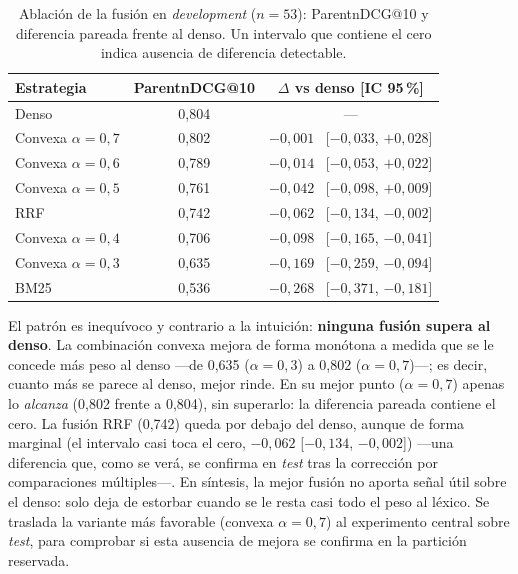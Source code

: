 \begin{table}[htbp]
    \centering
    \small
    \renewcommand{\arraystretch}{1.2}
    \caption{Ablación de la fusión en \emph{development} ($n=53$): ParentnDCG@10 y diferencia pareada frente al denso. Un intervalo que contiene el cero indica ausencia de diferencia detectable.}
    \label{tab:ablacion-fusion}
    \begin{tabular}{|l|c|c|}
        \hline
        \textbf{Estrategia} & \textbf{ParentnDCG@10} & \textbf{$\Delta$ vs denso [IC 95\,\%]} \\
        \hline
        Denso                 & 0,804 & --- \\
        Convexa $\alpha{=}0{,}7$ & 0,802 & $-0{,}001$ \ [$-0{,}033$, $+0{,}028$] \\
        Convexa $\alpha{=}0{,}6$ & 0,789 & $-0{,}014$ \ [$-0{,}053$, $+0{,}022$] \\
        Convexa $\alpha{=}0{,}5$ & 0,761 & $-0{,}042$ \ [$-0{,}098$, $+0{,}009$] \\
        RRF                   & 0,742 & $-0{,}062$ \ [$-0{,}134$, $-0{,}002$] \\
        Convexa $\alpha{=}0{,}4$ & 0,706 & $-0{,}098$ \ [$-0{,}165$, $-0{,}041$] \\
        Convexa $\alpha{=}0{,}3$ & 0,635 & $-0{,}169$ \ [$-0{,}259$, $-0{,}094$] \\
        BM25                  & 0,536 & $-0{,}268$ \ [$-0{,}371$, $-0{,}181$] \\
        \hline
    \end{tabular}
\end{table}

El patrón es inequívoco y contrario a la intuición: \textbf{ninguna fusión supera al denso}. La combinación convexa mejora de forma monótona a medida que se le concede más peso al denso —de 0,635 ($\alpha{=}0{,}3$) a 0,802 ($\alpha{=}0{,}7$)—; es decir, cuanto más se parece al denso, mejor rinde. En su mejor punto ($\alpha{=}0{,}7$) apenas lo \emph{alcanza} (0,802 frente a 0,804), sin superarlo: la diferencia pareada contiene el cero. La fusión RRF (0,742) queda por debajo del denso, aunque de forma marginal (el intervalo casi toca el cero, $-0{,}062$ [$-0{,}134$, $-0{,}002$]) —una diferencia que, como se verá, se confirma en \emph{test} tras la corrección por comparaciones múltiples—. En síntesis, la mejor fusión no aporta señal útil sobre el denso: solo deja de estorbar cuando se le resta casi todo el peso al léxico. Se traslada la variante más favorable (convexa $\alpha{=}0{,}7$) al experimento central sobre \emph{test}, para comprobar si esta ausencia de mejora se confirma en la partición reservada.

